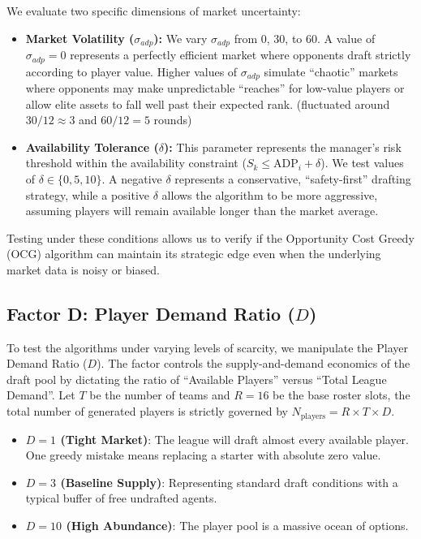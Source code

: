 \documentclass[11pt,a4paper]{article}
\begin{document}
We evaluate two specific dimensions of market uncertainty:
\begin{itemize}
    \item \textbf{Market Volatility ($\sigma_{adp}$):} We vary $\sigma_{adp}$ from $0$, 30, to $60$. A value of $\sigma_{adp} = 0$ represents a perfectly efficient market where opponents draft strictly according to player value. Higher values of $\sigma_{adp}$ simulate ``chaotic'' markets where opponents may make unpredictable ``reaches'' for low-value players or allow elite assets to fall well past their expected rank. (fluctuated around $30/12 \approx 3$ and $60/12=5$ rounds)
    \item \textbf{Availability Tolerance ($\delta$):} This parameter represents the manager's risk threshold within the availability constraint ($S_k \le \text{ADP}_i + \delta$). We test values of $\delta \in \{0, 5, 10\}$. A negative $\delta$ represents a conservative, ``safety-first'' drafting strategy, while a positive $\delta$ allows the algorithm to be more aggressive, assuming players will remain available longer than the market average.
\end{itemize}

Testing under these conditions allows us to verify if the Opportunity Cost Greedy (OCG) algorithm can maintain its strategic edge even when the underlying market data is noisy or biased.

\subsection{Factor D: Player Demand Ratio ($D$)}
To test the algorithms under varying levels of scarcity, we manipulate the Player Demand Ratio ($D$). The factor controls the supply-and-demand economics of the draft pool by dictating the ratio of ``Available Players'' versus ``Total League Demand''. Let $T$ be the number of teams and $R=16$ be the base roster slots, the total number of generated players is strictly governed by $N_{\text{players}} = R \times T \times D$.
\begin{itemize}[leftmargin=1.5em]
    \item \textbf{$D = 1$ (Tight Market)}: The league will draft almost every available player. One greedy mistake means replacing a starter with absolute zero value.
    \item \textbf{$D = 3$ (Baseline Supply)}: Representing standard draft conditions with a typical buffer of free undrafted agents.
    \item \textbf{$D = 10$ (High Abundance)}: The player pool is a massive ocean of options.
\end{itemize}
\end{document}
